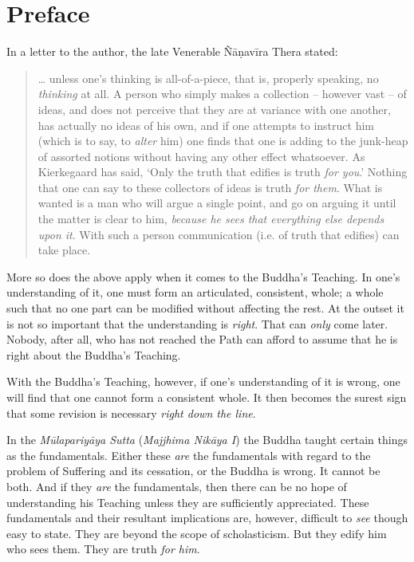 \chapter{Preface}

In a letter to the author, the late Venerable Ñāṇavīra Thera stated:

\begin{quote}
\ldots{} unless one's thinking is all-of-a-piece, that is, properly speaking, no \emph{thinking} at all. A person who simply makes a collection -- however vast -- of ideas, and does not perceive that they are at variance with one another, has actually no ideas of his own, and if one attempts to instruct him (which is to say, to \emph{alter} him) one finds that one is adding to the junk-heap of assorted notions without having any other effect whatsoever. As Kierkegaard has said, `Only the truth that edifies is truth \emph{for you}.' Nothing that one can say to these collectors of ideas is truth \emph{for them}. What is wanted is a man who will argue a single point, and go on arguing it until the matter is clear to him, \emph{because he sees that everything else depends upon it}. With such a person communication (i.e. of truth that edifies) can take place.
\end{quote}

More so does the above apply when it comes to the Buddha's Teaching. In one's understanding of it, one must form an articulated, consistent, whole; a whole such that no one part can be modified without affecting the rest. At the outset it is not so important that the understanding is \emph{right}. That can \emph{only} come later. Nobody, after all, who has not reached the Path can afford to assume that he is right about the Buddha's Teaching.

With the Buddha's Teaching, however, if one's understanding of it is wrong, one will find that one cannot form a consistent whole. It then becomes the surest sign that some revision is necessary \emph{right down the line}.

In the \textit{Mūlapariyāya Sutta} (\textit{Majjhima Nikāya I}) the Buddha taught certain things as the fundamentals. Either these \emph{are} the fundamentals with regard to the problem of Suffering and its cessation, or the Buddha is wrong. It cannot be both. And if they \emph{are} the fundamentals, then there can be no hope of understanding his Teaching unless they are sufficiently appreciated. These fundamentals and their resultant implications are, however, difficult to \emph{see} though easy to state. They are beyond the scope of scholasticism. But they edify him who sees them. They are truth \emph{for him}.

